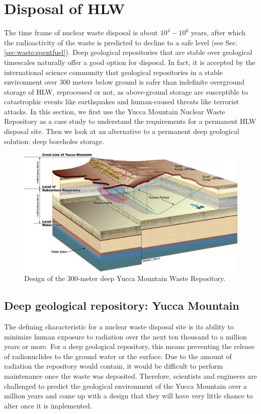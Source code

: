 \documentclass[nofootinbib,preprint,aps]{revtex4-1}
\begin{document}
\section{Disposal of HLW}
\label{sec:disposal}
    The time frame of nuclear waste disposal is about $10^4-10^6$ years, after which the radioactivity
    of the waste is predicted to decline to a safe level (see Sec.\ref{sec:waste:spentfuel}).
    Deep geological repositories that are stable over geological timescales naturally offer a good option for disposal.
    In fact, it is accepted by the international science community that geological repositories in a stable environment over 300 meters below ground
    is safer than indefinite overground storage of HLW, reprocessed or not, as above-ground storage
    are susceptible to catastrophic events like earthquakes and human-caused threats like terrorist attacks.\cite{fmr11}
    In this section, we first use the Yucca Mountain Nuclear Waste
    Repository     as a case study to understand the requirements for a permanent HLW disposal site.
    Then we look at an alternative to a permanent deep geological solution:
    deep boreholes storage.
        \begin{figure}[h]
            \centering
            \includegraphics[width=\textwidth]{yuccaRepo.jpg}
            \caption{Design of the 300-meter deep Yucca Mountain Waste Repository.\cite{yucpic}}
            \label{fig:yucca}
        \end{figure}
    \subsection{Deep geological repository: Yucca Mountain}
        The defining characteristic for a nuclear waste disposal site is its ability to minimize human
        exposure to radiation over the next ten thousand to a million years or more.
        For a deep geological repository, this means preventing the release
        of radionuclides to the ground water or the surface.
        Due to the amount of radiation the repository would contain, it would be difficult to perform
        maintenance once the waste was deposited. Therefore, scientists and engineers are challenged
        to predict the geological environment of the Yucca Mountain over a million years and come up
        with a design that they will have very little chance to alter once it is implemented.
\end{document}
